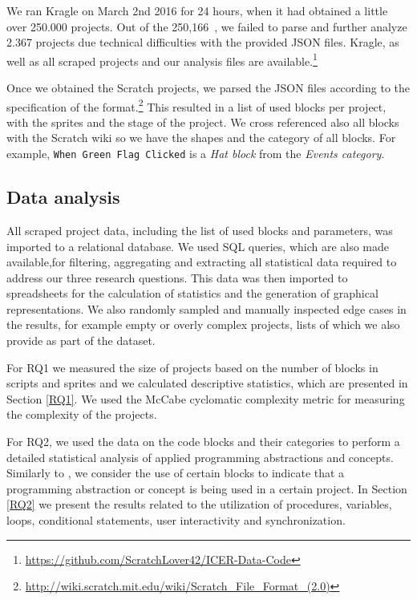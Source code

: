 \documentclass{sig-alternate}
\newcommand{\nPrograms}{250,166}
\begin{document}

We ran Kragle on March 2nd 2016 for 24 hours, when it had obtained a little over 250.000 projects. Out of the \nPrograms~, we failed to parse and further analyze 2.367 projects due technical difficulties with the provided JSON files. Kragle, as well as all scraped projects and our analysis files are available.\footnote{\label{repo}\url{https://github.com/ScratchLover42/ICER-Data-Code}}

Once we obtained the Scratch projects, we parsed the JSON files according to the specification of the format.\footnote{\url{http://wiki.scratch.mit.edu/wiki/Scratch_File_Format_(2.0)}} This resulted in a list of used blocks per project, with the sprites and the stage of the project. We cross referenced also all blocks with the Scratch wiki so we have the shapes and the category of all blocks. For example, \texttt{When Green Flag Clicked} is a \emph{Hat block} from the \emph{Events category}.

\subsection{Data analysis}
\label{dataAnalysis}
All scraped project data, including the list of used blocks and parameters, was imported to a relational database. We used SQL queries, which are also made available,\footnotemark[\ref{repo}] for filtering, aggregating and extracting all statistical data required to address our three research questions. This data was then imported to spreadsheets for the calculation of statistics and the generation of graphical representations. We also randomly sampled and manually inspected edge cases in the results, for example empty or overly complex projects, lists of which we also provide as part of the dataset.\footnotemark[\ref{repo}]

For RQ1 we measured the size of projects based on the number of blocks in scripts and sprites and we calculated descriptive statistics, which are presented in Section \ref{RQ1}. We used the McCabe cyclomatic complexity metric\cite{mcCabe76} for measuring the complexity of the projects.

For RQ2, we used the data on the code blocks and their categories to perform a detailed statistical analysis of applied programming abstractions and concepts. Similarly to \cite{Maloney_2008}, we consider the use of certain blocks to indicate that a programming abstraction or concept is being used in a certain project. In Section \ref{RQ2} we present the results related to the utilization of procedures, variables, loops, conditional statements, user interactivity and synchronization.
\end{document}
